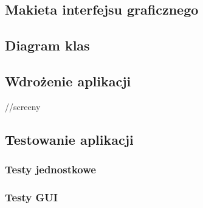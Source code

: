 

    
\subsection{Makieta interfejsu graficznego} 


\subsection{Diagram klas}


\subsection{Wdrożenie aplikacji} //screeny


\subsection{Testowanie aplikacji}
    \subsubsection{Testy jednostkowe}
    

    \subsubsection{Testy GUI}
    
